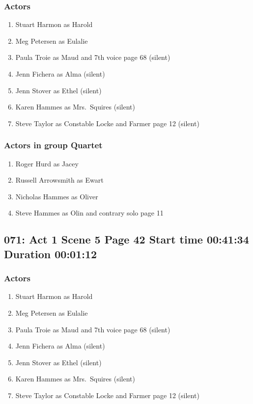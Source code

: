 \subsubsection{Actors}
\begin{enumerate}
\item Stuart Harmon as Harold
\item Meg Petersen as Eulalie
\item Paula Troie as Maud and 7th voice page 68 (silent)
\item Jenn Fichera as Alma (silent)
\item Jenn Stover as Ethel (silent)
\item Karen Hammes as Mrs.~Squires (silent)
\item Steve Taylor as Constable Locke and Farmer page 12 (silent)
\end{enumerate}
\subsubsection{Actors in group Quartet}
\begin{enumerate}
\item Roger Hurd as Jacey
\item Russell Arrowsmith as Ewart
\item Nicholas Hammes as Oliver
\item Steve Hammes as Olin and contrary solo page 11
\end{enumerate}


\subsection{071: Act 1 Scene 5 Page 42 Start time 00:41:34 Duration 00:01:12}

\subsubsection{Actors}
\begin{enumerate}
\item Stuart Harmon as Harold
\item Meg Petersen as Eulalie
\item Paula Troie as Maud and 7th voice page 68 (silent)
\item Jenn Fichera as Alma (silent)
\item Jenn Stover as Ethel (silent)
\item Karen Hammes as Mrs.~Squires (silent)
\item Steve Taylor as Constable Locke and Farmer page 12 (silent)
\end{enumerate}

